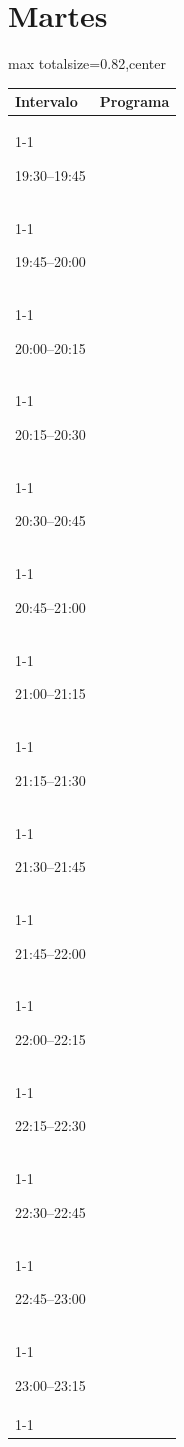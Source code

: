 \documentclass[11pt,a4paper]{article}
\begin{document}
\section*{Martes}
\begin{center}
\begin{adjustbox}{max totalsize={\textwidth}{0.82\textheight},center}
\begin{tabular}{|p{3.6cm}|p{11cm}|}
\hline
\textbf{Intervalo} & \textbf{Programa} \\
\cline{1-1}
{\centering\rule{0pt}{2.80ex}19:30--19:45} & {\centering\rule{0pt}{2.80ex}} \\
\cline{1-1}
{\centering\rule{0pt}{2.80ex}19:45--20:00} & {\centering\rule{0pt}{2.80ex}} \\
\cline{1-1}
{\centering\rule{0pt}{2.80ex}20:00--20:15} & {\centering\rule{0pt}{2.80ex}} \\
\cline{1-1}
{\centering\rule{0pt}{2.80ex}20:15--20:30} & {\centering\rule{0pt}{2.80ex}} \\
\cline{1-1}
{\centering\rule{0pt}{2.80ex}20:30--20:45} & {\centering\rule{0pt}{2.80ex}} \\
\cline{1-1}
{\centering\rule{0pt}{2.80ex}20:45--21:00} & {\centering\rule{0pt}{2.80ex}} \\
\cline{1-1}
{\centering\rule{0pt}{2.80ex}21:00--21:15} & {\centering\rule{0pt}{2.80ex}} \\
\cline{1-1}
{\centering\rule{0pt}{2.80ex}21:15--21:30} & {\centering\rule{0pt}{2.80ex}} \\
\cline{1-1}
{\centering\rule{0pt}{2.80ex}21:30--21:45} & {\centering\rule{0pt}{2.80ex}} \\
\cline{1-1}
{\centering\rule{0pt}{2.80ex}21:45--22:00} & {\centering\rule{0pt}{2.80ex}} \\
\cline{1-1}
{\centering\rule{0pt}{2.80ex}22:00--22:15} & {\centering\rule{0pt}{2.80ex}} \\
\cline{1-1}
{\centering\rule{0pt}{2.80ex}22:15--22:30} & {\centering\rule{0pt}{2.80ex}} \\
\cline{1-1}
{\centering\rule{0pt}{2.80ex}22:30--22:45} & {\centering\rule{0pt}{2.80ex}} \\
\cline{1-1}
{\centering\rule{0pt}{2.80ex}22:45--23:00} & {\centering\rule{0pt}{2.80ex}} \\
\cline{1-1}
{\centering\rule{0pt}{2.80ex}23:00--23:15} & {\centering\rule{0pt}{2.80ex}} \\
\cline{1-1}
\hline
\end{tabular}
\end{adjustbox}
\end{center}
\end{document}
